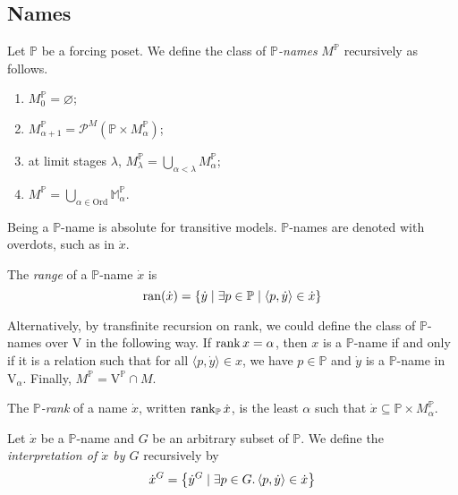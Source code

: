 \subsection{Names}
\begin{definition}
    Let \( \mathbb P \) be a forcing poset.
    We define the class of \emph{\( \mathbb P \)-names} \( M^{\mathbb P} \) recursively as follows.
    \begin{enumerate}
        \item \( M_0^{\mathbb P} = \varnothing \);
        \item \( M_{\alpha + 1}^{\mathbb P} = \mathcal P^M(\mathbb P \times M_\alpha^{\mathbb P}) \);
        \item at limit stages \( \lambda \), \( M_\lambda^{\mathbb P} = \bigcup_{\alpha < \lambda} M_\alpha^{\mathbb P} \);
        \item \( M^{\mathbb P} = \bigcup_{\alpha \in \mathrm{Ord}} \mathbb M_\alpha^{\mathbb P} \).
    \end{enumerate}
\end{definition}
Being a \( \mathbb P \)-name is absolute for transitive models.
\( \mathbb P \)-names are denoted with overdots, such as in \( \dot x \).
\begin{definition}
    The \emph{range} of a \( \mathbb P \)-name \( \dot x \) is
    \[ \operatorname{ran}(\dot x) = \qty{\dot y \mid \exists p \in \mathbb P \mid \langle p, \dot y \rangle \in \dot x} \]
\end{definition}
\begin{remark}
    Alternatively, by transfinite recursion on rank, we could define the class of \( \mathbb P \)-names over \( \mathrm{V} \) in the following way.
    If \( \rank x = \alpha \), then \( x \) is a \( \mathbb P \)-name if and only if it is a relation such that for all \( \langle p, \dot y \rangle \in x \), we have \( p \in \mathbb P \) and \( \dot y \) is a \( \mathbb P \)-name in \( \mathrm{V}_\alpha \).
    Finally, \( M^{\mathbb P} = \mathrm{V}^{\mathbb P} \cap M \).
\end{remark}
\begin{definition}
    The \emph{\( \mathbb P \)-rank} of a name \( \dot x \), written \( \rank_{\mathbb P} \dot x \), is the least \( \alpha \) such that \( \dot x \subseteq \mathbb P \times M_\alpha^{\mathbb P} \).
\end{definition}
\begin{definition}
    Let \( \dot x \) be a \( \mathbb P \)-name and \( G \) be an arbitrary subset of \( \mathbb P \).
    We define the \emph{interpretation of \( \dot x \) by \( G \)} recursively by
    \[ \dot x^G = \qty{\dot y^G \mid \exists p \in G.\, \langle p, \dot y \rangle \in \dot x} \]
\end{definition}
